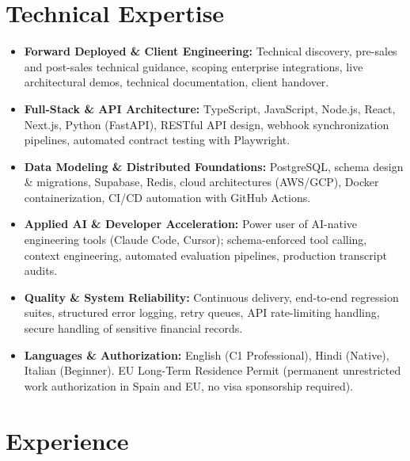 \documentclass[10pt,a4paper]{article}
\begin{document}
\section{Technical Expertise}
\begin{itemize}
  \item \textbf{Forward Deployed \& Client Engineering:} Technical discovery, pre-sales and post-sales technical guidance, scoping enterprise integrations, live architectural demos, technical documentation, client handover.
  \item \textbf{Full-Stack \& API Architecture:} TypeScript, JavaScript, Node.js, React, Next.js, Python (FastAPI), RESTful API design, webhook synchronization pipelines, automated contract testing with Playwright.
  \item \textbf{Data Modeling \& Distributed Foundations:} PostgreSQL, schema design \& migrations, Supabase, Redis, cloud architectures (AWS/GCP), Docker containerization, CI/CD automation with GitHub Actions.
  \item \textbf{Applied AI \& Developer Acceleration:} Power user of AI-native engineering tools (Claude Code, Cursor); schema-enforced tool calling, context engineering, automated evaluation pipelines, production transcript audits.
  \item \textbf{Quality \& System Reliability:} Continuous delivery, end-to-end regression suites, structured error logging, retry queues, API rate-limiting handling, secure handling of sensitive financial records.
  \item \textbf{Languages \& Authorization:} English (C1 Professional), Hindi (Native), Italian (Beginner). EU Long-Term Residence Permit (permanent unrestricted work authorization in Spain and EU, no visa sponsorship required).
\end{itemize}

\section{Experience}
\end{document}
